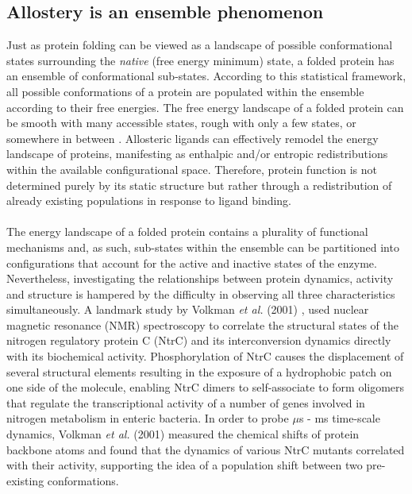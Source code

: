 \subsection{Allostery is an ensemble phenomenon}
\label{subsec:allostery_ensemble}
Just as protein folding can be viewed as a landscape of possible conformational states surrounding the \textit{native} (free energy minimum) state, a folded protein has an ensemble of conformational sub-states. According to this statistical framework, all possible conformations of a protein are populated within the ensemble according to their free energies. The free energy landscape of a folded protein can be smooth with many accessible states, rough with only a few states, or somewhere in between \cite{Vendruscolo:2005aa}. Allosteric ligands can effectively remodel the energy landscape of proteins, manifesting as enthalpic and/or entropic redistributions within the available configurational space. Therefore, protein function is not determined purely by its static structure but rather through a redistribution of already existing populations in response to ligand binding. 
%
%
\\\\
%
%
The energy landscape of a folded protein contains a plurality of functional mechanisms and, as such, sub-states within the ensemble can be partitioned into configurations that account for the active and inactive states of the enzyme. Nevertheless, investigating the relationships between protein dynamics, activity and structure is hampered by the difficulty in observing all three characteristics simultaneously. A landmark study by Volkman \textit{et al.} (2001) \cite{Volkman:2001aa}, used nuclear magnetic resonance (NMR) spectroscopy to correlate the structural states of the nitrogen regulatory protein C (NtrC) and its interconversion dynamics directly with its biochemical activity. Phosphorylation of NtrC causes the displacement of several structural elements resulting in the exposure of a hydrophobic patch on one side of the molecule, enabling NtrC dimers to self-associate to form oligomers that regulate the transcriptional activity of a number of genes involved in nitrogen metabolism in enteric bacteria. In order to probe $\mu$s - ms time-scale dynamics, Volkman \textit{et al.} (2001) \cite{Volkman:2001aa} measured the chemical shifts of protein backbone atoms and found that the dynamics of various NtrC mutants correlated with their activity, supporting the idea of a population shift between two pre-existing conformations.
%
%
\\\\
